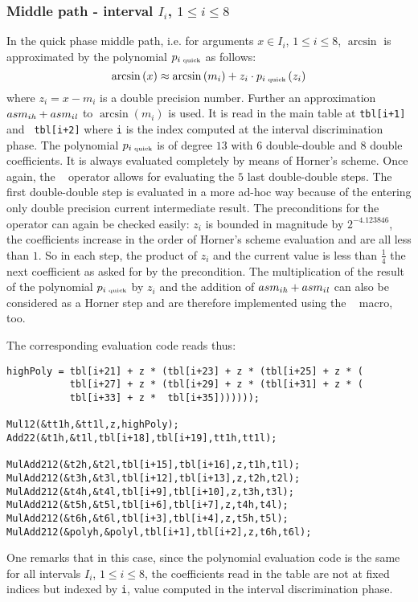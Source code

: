 \subsubsection{Middle path - interval $I_i$, $1 \leq i \leq 8$}
In the quick phase middle path, i.e. for arguments $x \in I_i$, $1
\leq i \leq 8$, $\arcsin$ is approximated by the polynomial
$p_{i\mbox{\tiny ~quick}}$ as follows:
$$\arcsin\left( x \right) \approx \arcsin\left( m_i \right) + z_i \cdot p_{i\mbox{\tiny ~quick}}\left( z_i \right)$$
where $z_i = x - m_i$ is a double precision number.  Further an
approximation $asm_{i\mathit{h}} + asm_{i\mathit{l}}$ to $\arcsin\left( m_i \right)$
is used. It is read in the main table at {\tt tbl[i+1]} and {\tt
  tbl[i+2]} where {\tt i} is the index computed at the interval
discrimination phase.  The polynomial $p_{i\mbox{\tiny ~quick}}$ is of
degree $13$ with $6$ double-double and $8$ double coefficients.  It is
always evaluated completely by means of Horner's scheme. Once again,
the \MulAddDdD~ operator allows for evaluating the $5$ last
double-double steps. The first double-double step is evaluated in a
more ad-hoc way because of the entering only double precision current
intermediate result. The preconditions for the \MulAddDdD~ operator
can again be checked easily: $z_i$ is bounded in magnitude by
$2^{-4.123846}$, the coefficients increase in the order of Horner's
scheme evaluation and are all less than $1$. So in each step, the
product of $z_i$ and the current value is less than $\frac{1}{4}$ the
next coefficient as asked for by the precondition.  The multiplication
of the result of the polynomial $p_{i\mbox{\tiny ~quick}}$ by $z_i$
and the addition of $asm_{i\mathit{h}} + asm_{i\mathit{l}}$ can also be considered
as a Horner step and are therefore implemented using the \MulAddDdD~
macro, too.

The corresponding evaluation code reads thus:
\begin{lstlisting}[caption={Middle path quick phase polynomial approximation},firstnumber=1]
highPoly = tbl[i+21] + z * (tbl[i+23] + z * (tbl[i+25] + z * (
           tbl[i+27] + z * (tbl[i+29] + z * (tbl[i+31] + z * (
           tbl[i+33] + z *  tbl[i+35]))))));

Mul12(&tt1h,&tt1l,z,highPoly);
Add22(&t1h,&t1l,tbl[i+18],tbl[i+19],tt1h,tt1l);

MulAdd212(&t2h,&t2l,tbl[i+15],tbl[i+16],z,t1h,t1l);
MulAdd212(&t3h,&t3l,tbl[i+12],tbl[i+13],z,t2h,t2l);
MulAdd212(&t4h,&t4l,tbl[i+9],tbl[i+10],z,t3h,t3l);
MulAdd212(&t5h,&t5l,tbl[i+6],tbl[i+7],z,t4h,t4l);
MulAdd212(&t6h,&t6l,tbl[i+3],tbl[i+4],z,t5h,t5l);
MulAdd212(&polyh,&polyl,tbl[i+1],tbl[i+2],z,t6h,t6l);
\end{lstlisting}
One remarks that in this case, since the polynomial evaluation code is
the same for all intervals $I_i$, $1 \leq i \leq 8$, the coefficients
read in the table are not at fixed indices but indexed by {\tt i},
value computed in the interval discrimination phase.

